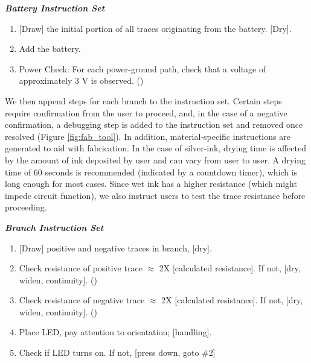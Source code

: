 \documentclass{sigchi}
\begin{document}
       \begin{framed}
                \begin{center}
                \textbf{\textit{Battery Instruction Set}}
                \end{center}
                \vspace{5pt}
                \begin{enumerate}
                      \item {[}Draw{]} the initial portion of all traces originating from the battery. [Dry].
                      \item Add the battery.
                      \item Power Check: For each power-ground path, check that a voltage of approximately 3 V is observed. ()
                \end{enumerate}
        \end{framed}        

        We then append steps for each branch to the instruction set. Certain steps require confirmation from the user to proceed, and, in the case of a negative confirmation, a debugging step is added to the instruction set and removed once resolved (Figure \ref{fig:fab_tool}). In addition, material-specific instructions are generated to aid with fabrication. In the case of silver-ink, drying time is affected by the amount of ink deposited by user and can vary from user to user. A drying time of 60 seconds is recommended (indicated by a countdown timer), which is long enough for most cases. Since wet ink has a higher resistance (which might impede circuit function), we also instruct users to test the trace resistance before proceeding. 
        
            \begin{framed}
                \begin{center}
                \textbf{\textit{Branch Instruction Set}}
                \end{center}
                \vspace{5pt}
              \begin{enumerate}  
                  \item {[}Draw{]} positive and negative traces in branch, [dry].
                  \item Check resistance of positive trace $\approx$ 2X [calculated resistance]. If not, [dry, widen, continuity]. ()
                  \item Check resistance of negative trace $\approx$ 2X [calculated resistance]. If not, [dry, widen, continuity]. ()
                  \item Place LED, pay attention to orientation; [handling].
                  \item Check if LED turns on. If not, [press down, goto \#2]
              \end{enumerate}
            \end{framed}
     
\end{document}
